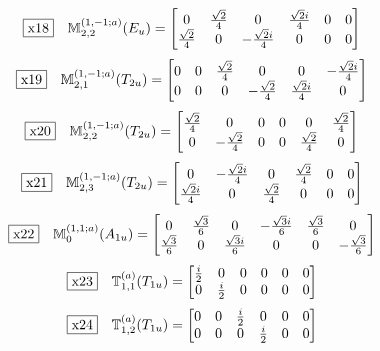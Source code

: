\documentclass[fleqn,10pt,landscape]{jsarticle}
\begin{document}
\begin{dmath*}
\fbox{x18}\quad \mathbb{M}_{2,2}^{(1,-1;a)}(E_{u})=\begin{bmatrix} 0 & \frac{\sqrt{2}}{4} & 0 & \frac{\sqrt{2} i}{4} & 0 & 0 \\ \frac{\sqrt{2}}{4} & 0 & - \frac{\sqrt{2} i}{4} & 0 & 0 & 0 \end{bmatrix}
\end{dmath*}
\begin{dmath*}
\fbox{x19}\quad \mathbb{M}_{2,1}^{(1,-1;a)}(T_{2u})=\begin{bmatrix} 0 & 0 & \frac{\sqrt{2}}{4} & 0 & 0 & - \frac{\sqrt{2} i}{4} \\ 0 & 0 & 0 & - \frac{\sqrt{2}}{4} & \frac{\sqrt{2} i}{4} & 0 \end{bmatrix}
\end{dmath*}
\begin{dmath*}
\fbox{x20}\quad \mathbb{M}_{2,2}^{(1,-1;a)}(T_{2u})=\begin{bmatrix} \frac{\sqrt{2}}{4} & 0 & 0 & 0 & 0 & \frac{\sqrt{2}}{4} \\ 0 & - \frac{\sqrt{2}}{4} & 0 & 0 & \frac{\sqrt{2}}{4} & 0 \end{bmatrix}
\end{dmath*}
\begin{dmath*}
\fbox{x21}\quad \mathbb{M}_{2,3}^{(1,-1;a)}(T_{2u})=\begin{bmatrix} 0 & - \frac{\sqrt{2} i}{4} & 0 & \frac{\sqrt{2}}{4} & 0 & 0 \\ \frac{\sqrt{2} i}{4} & 0 & \frac{\sqrt{2}}{4} & 0 & 0 & 0 \end{bmatrix}
\end{dmath*}
\begin{dmath*}
\fbox{x22}\quad \mathbb{M}_{0}^{(1,1;a)}(A_{1u})=\begin{bmatrix} 0 & \frac{\sqrt{3}}{6} & 0 & - \frac{\sqrt{3} i}{6} & \frac{\sqrt{3}}{6} & 0 \\ \frac{\sqrt{3}}{6} & 0 & \frac{\sqrt{3} i}{6} & 0 & 0 & - \frac{\sqrt{3}}{6} \end{bmatrix}
\end{dmath*}
\begin{dmath*}
\fbox{x23}\quad \mathbb{T}_{1,1}^{(a)}(T_{1u})=\begin{bmatrix} \frac{i}{2} & 0 & 0 & 0 & 0 & 0 \\ 0 & \frac{i}{2} & 0 & 0 & 0 & 0 \end{bmatrix}
\end{dmath*}
\begin{dmath*}
\fbox{x24}\quad \mathbb{T}_{1,2}^{(a)}(T_{1u})=\begin{bmatrix} 0 & 0 & \frac{i}{2} & 0 & 0 & 0 \\ 0 & 0 & 0 & \frac{i}{2} & 0 & 0 \end{bmatrix}
\end{dmath*}
\end{document}
